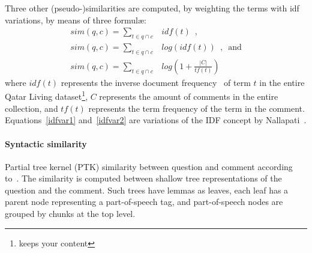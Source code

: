 Three other (pseudo-)similarities are computed, by weighting the terms with idf 
variations, by means of three formul\ae: 
%
\begin{eqnarray}
 sim(q, c)=\sum_{t\in q\cap c} & idf(t) \enspace,		\\
 sim(q, c)=\sum_{t\in q\cap c} & log(idf(t)) \enspace, \enspace \mathrm{and} 
\label{idfvar1}\\
 sim(q, c)=\sum_{t\in q\cap c} & log\left(1 + \frac{|C|}{tf(t)}\right) 
\label{idfvar2}
\end{eqnarray}
% 
where $idf(t)$ represents the inverse document frequency~\cite{Jones:1972} 
of term $t$ in the entire Qatar Living dataset\footnote{keeps your content}, 
$C$ represents the amount of comments in the entire collection, and $tf(t)$ 
represents the term frequency of the term in the comment. 
Equations~\ref{idfvar1} and~\ref{idfvar2} are variations of the IDF 
concept by Nallapati~.














\paragraph{Syntactic similarity}
\label{ssub:syntactic}

Partial tree kernel (PTK) similarity between question and comment according 
to~\cite{Moschitti:2006}. The similarity is computed between shallow tree representations of the question and the comment. Such trees have lemmas as leaves, each leaf has a parent node representing a part-of-speech tag, and part-of-speech nodes are grouped by chunks at the top level.

